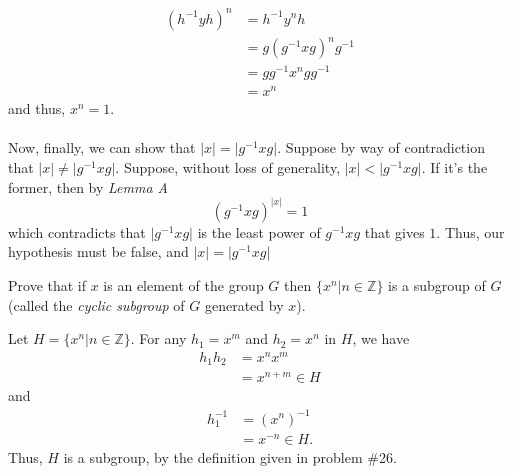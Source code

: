 \documentclass[12 pt, letterpaper]{hmcpset}
\begin{document}
\begin{solution}
\[\begin{split}
			(h^{-1} y h)^n & = h^{-1} y^n h \\
				       & = g (g^{-1} x g)^n g^{-1} \\
				       & = g g^{-1} x^n g g^{-1} \\
				       & = x^n
		\end{split}
	\]
	and thus, $x^n = 1$. \\\\
	Now, finally, we can show that $\lvert x \rvert = \lvert g^{-1} x g \rvert$. Suppose by way of contradiction that $\lvert x \rvert \neq \lvert g^{-1} x g \rvert$. Suppose, without loss of generality, $\lvert x \rvert < \lvert g^{-1} x g \rvert$. If it's the former, then by \textit{Lemma A}
	\[
		(g^{-1} x g)^{\lvert x \rvert} = 1
	\]
	which contradicts that $\lvert g^{-1} x g \rvert$ is the least power of $g^{-1} x g$ that gives $1$. Thus, our hypothesis must be false, and $\lvert x \rvert = \lvert g^{-1} x g \rvert$
\end{solution}

\pagebreak

\begin{problem}
	Prove that if $x$ is an element of the group $G$ then $\{ x^n | n \in \mathbb Z \}$ is a subgroup of $G$ (called the \textit{cyclic subgroup} of $G$ generated by $x$).
\end{problem}

\begin{solution}
	Let $H = \{ x^n | n \in \mathbb Z \}$. For any $h_1 = x^m$ and $h_2 = x^n$ in $H$, we have
	\[
		\begin{split}
			h_1 h_2 & = x^n x^m \\
				& = x^{n + m} \in H
		\end{split}
	\]
	and
	\[
		\begin{split}
			h_1^{-1} & = (x^n)^{-1} \\
				 & = x^{-n} \in H.
		\end{split}
	\]
	Thus, $H$ is a subgroup, by the definition given in problem \#26.
\end{solution}
\end{document}
